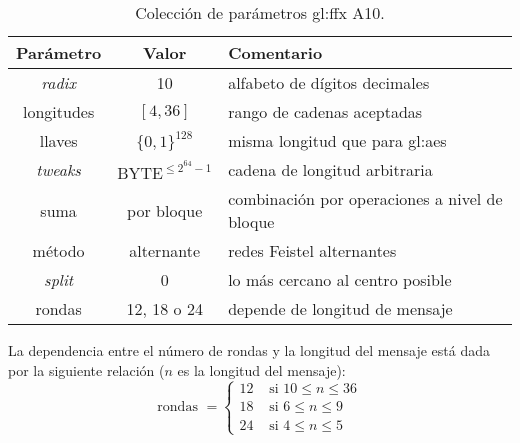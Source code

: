 \begin{table}
  \centering
  \begin{tabular}{| c | c | l |}
    \hline
    \textbf{Parámetro} &
    \textbf{Valor} &
    \textbf{Comentario} \\
    \hline

    \textit{radix}  & 10 & alfabeto de dígitos decimales \\
    \hline

    longitudes & $ [ 4, 36 ] $ & rango de cadenas aceptadas \\
    \hline

    llaves & $ \{ 0, 1\}^{128} $ & misma longitud que para \gls{gl:aes} \\
    \hline

    \textit{tweaks} & $ \text{BYTE}^{\leq 2^{64} - 1} $ & cadena de longitud
    arbitraria \\
    \hline

    suma & por bloque & combinación por operaciones a nivel de bloque \\
    \hline

    método & alternante & redes Feistel alternantes \\
    \hline

    \textit{split} & 0 & lo más cercano al centro posible \\
    \hline

    rondas & 12, 18 o 24 & depende de longitud de mensaje \\
    \hline

  \end{tabular}
  \caption{Colección de parámetros \gls{gl:ffx} A10.}
  \label{ffx_a10}
\end{table}

La dependencia entre el número de rondas y la longitud del mensaje está dada
por la siguiente relación ($ n $ es la longitud del mensaje):
\begin{equation}
  \text{rondas } =
  \begin{cases}
    12 & \text{ si } 10 \leq n \leq 36 \\
    18 & \text{ si } 6  \leq n \leq 9 \\
    24 & \text{ si } 4  \leq n \leq 5
  \end{cases}
\end{equation}

